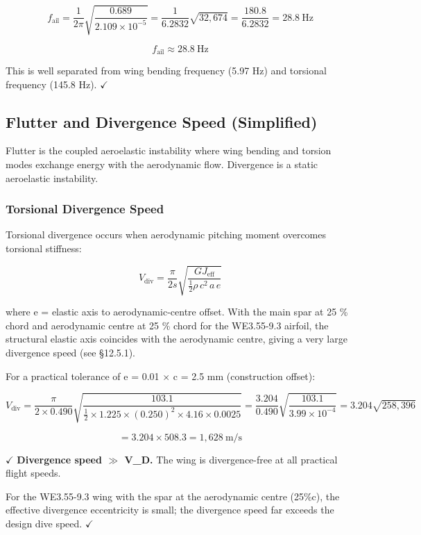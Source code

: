 \documentclass[10pt,a4paper]{article}
\begin{document}
\[
f_{\text{ail}} = \frac{1}{2\pi}\sqrt{\frac{0.689}{2.109 \times 10^{-5}}} = \frac{1}{6.2832}\sqrt{32,674} = \frac{180.8}{6.2832} = 28.8\ \text{Hz}
\]

\[
\boxed{f_{\text{ail}} \approx 28.8\ \text{Hz}}
\]

This is well separated from wing bending frequency (5.97 Hz) and torsional frequency (145.8 Hz). $\checkmark $


\subsection{Flutter and Divergence Speed (Simplified)}


Flutter is the coupled aeroelastic instability where wing bending and torsion modes exchange energy with the aerodynamic flow. Divergence is a static aeroelastic instability.


\subsubsection{Torsional Divergence Speed}


Torsional divergence occurs when aerodynamic pitching moment overcomes torsional stiffness:

\[
V_{\text{div}} = \frac{\pi}{2s}\sqrt{\frac{GJ_{\text{eff}}}{\frac{1}{2}\rho\, c^2\, a\, e}}
\]

where e = elastic axis to aerodynamic-centre offset. With the main spar at 25 \% chord and aerodynamic centre at 25 \% chord for the WE3.55-9.3 airfoil, the structural elastic axis coincides with the aerodynamic centre, giving a very large divergence speed (see §12.5.1).

For a practical tolerance of e = 0.01 ${\times}$ c = 2.5 mm (construction offset):

\[
V_{\text{div}} = \frac{\pi}{2 \times 0.490}\sqrt{\frac{103.1}{\frac{1}{2} \times 1.225 \times (0.250)^2 \times 4.16 \times 0.0025}} = \frac{3.204}{0.490}\sqrt{\frac{103.1}{3.99 \times 10^{-4}}} = 3.204\sqrt{258,396}
\]

\[
= 3.204 \times 508.3 = 1,628\ \text{m/s}
\]

$\checkmark $ \textbf{Divergence speed $\gg$ V\_D.} The wing is divergence-free at all practical flight speeds.

For the WE3.55-9.3 wing with the spar at the aerodynamic centre (25\%c), the effective divergence eccentricity is small; the divergence speed far exceeds the design dive speed. $\checkmark $
\end{document}
